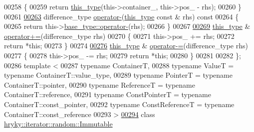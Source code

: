 \begin{DoxyCode}
00258 \textcolor{keyword}{    }\{
00259         \textcolor{keywordflow}{return} \hyperlink{classhryky_1_1iterator_1_1random_1_1_base}{this_type}(this->container\_, this->pos\_ - rhs);
00260     \}
00261 
\hypertarget{iterator__random_8h_source_l00263}{}\hyperlink{classhryky_1_1iterator_1_1random_1_1_mutable_a0bf0d1dff828498261fae9c8d574da01}{00263}     difference\_type \hyperlink{classhryky_1_1iterator_1_1random_1_1_mutable_acbc46577879f80298ea9b7da5c521926}{operator-}(\hyperlink{classhryky_1_1iterator_1_1random_1_1_base}{this_type} \textcolor{keyword}{const} & rhs)\textcolor{keyword}{ const}
00264 \textcolor{keyword}{    }\{
00265         \textcolor{keywordflow}{return} this->\hyperlink{classhryky_1_1iterator_1_1random_1_1_base_a0c758ff331507eb57f757ac475bdf987}{base_type::operator-}(rhs);
00266     \}
00267 
\hypertarget{iterator__random_8h_source_l00269}{}\hyperlink{classhryky_1_1iterator_1_1random_1_1_mutable_abd79f5602af209d1df8f48e886c10fa4}{00269}     \hyperlink{classhryky_1_1iterator_1_1random_1_1_base}{this_type} & \hyperlink{classhryky_1_1iterator_1_1random_1_1_mutable_abd79f5602af209d1df8f48e886c10fa4}{operator+=}(difference\_type rhs)
00270     \{
00271         this->pos\_ += rhs;
00272         \textcolor{keywordflow}{return} *\textcolor{keyword}{this};
00273     \}
00274 
\hypertarget{iterator__random_8h_source_l00276}{}\hyperlink{classhryky_1_1iterator_1_1random_1_1_mutable_aed7712523cb7c6f9935f6ffdd6e5a76d}{00276}     \hyperlink{classhryky_1_1iterator_1_1random_1_1_base}{this_type} & \hyperlink{classhryky_1_1iterator_1_1random_1_1_mutable_aed7712523cb7c6f9935f6ffdd6e5a76d}{operator-=}(difference\_type rhs)
00277     \{
00278         this->pos\_ -= rhs;
00279         \textcolor{keywordflow}{return} *\textcolor{keyword}{this};
00280     \}
00281 
00282 \};
00286 \textcolor{keyword}{template} <
00287     \textcolor{keyword}{typename} ContainerT,
00288     \textcolor{keyword}{typename} ValueT = \textcolor{keyword}{typename} ContainerT::value\_type,
00289     \textcolor{keyword}{typename} PointerT = \textcolor{keyword}{typename} ContainerT::pointer,
00290     \textcolor{keyword}{typename} ReferenceT = \textcolor{keyword}{typename} ContainerT::reference,
00291     \textcolor{keyword}{typename} ConstPointerT = \textcolor{keyword}{typename} ContainerT::const\_pointer,
00292     \textcolor{keyword}{typename} ConstReferenceT = \textcolor{keyword}{typename} ContainerT::const\_reference
00293     >
\hypertarget{iterator__random_8h_source_l00294}{}\hyperlink{classhryky_1_1iterator_1_1random_1_1_immutable}{00294} \textcolor{keyword}{class }\hyperlink{classhryky_1_1iterator_1_1random_1_1_immutable}{hryky::iterator::random::Immutable}

\end{DoxyCode}
